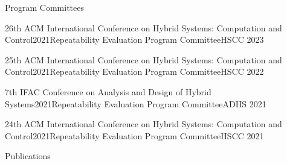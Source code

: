 \documentclass{resume}
\begin{document}
\begin{rSection}{Program Committees}

\begin{rSubsectionEmpty}{26th ACM International Conference on Hybrid Systems: Computation and Control}{2021}{Repeatability Evaluation Program Committee}{HSCC 2023}
\end{rSubsectionEmpty}

\begin{rSubsectionEmpty}{25th ACM International Conference on Hybrid Systems: Computation and Control}{2021}{Repeatability Evaluation Program Committee}{HSCC 2022}
\end{rSubsectionEmpty}


\begin{rSubsectionEmpty}{7th IFAC Conference on Analysis and Design of Hybrid Systems}{2021}{Repeatability Evaluation Program Committee}{ADHS 2021}
\end{rSubsectionEmpty}

\begin{rSubsectionEmpty}{24th ACM International Conference on Hybrid Systems: Computation and Control}{2021}{Repeatability Evaluation Program Committee}{HSCC 2021}
\end{rSubsectionEmpty}

\end{rSection}

\begin{rSection}{Publications}



\end{rSection}
\end{document}
